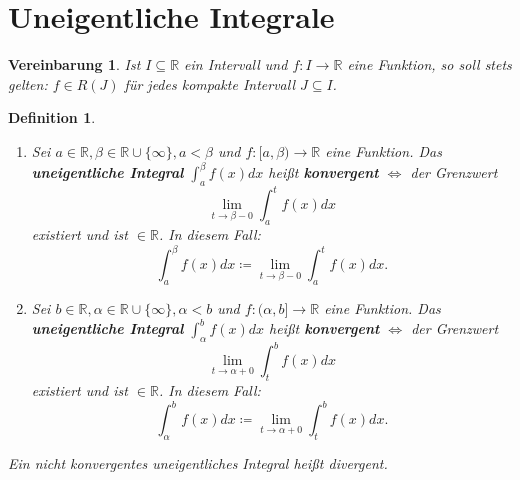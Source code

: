 \documentclass[titlepage,ngerman,a4paper,headsepline]{scrartcl}
\newcommand{\R}{\mathbb{R}}
\theoremstyle{named}
\theoremstyle{dotless}
\newtheorem*{definition}{Definition}
\newtheorem*{vereinbarung}{Vereinbarung}
\begin{document}
\newpage


\section{Uneigentliche Integrale}


\begin{vereinbarung}
	Ist $I \subseteq \R$ ein Intervall und $f \colon I \rightarrow \R$ eine Funktion, so soll stets gelten: $f \in R(J)$ für jedes kompakte Intervall $J \subseteq I$.	
\end{vereinbarung}

 
\begin{definition} ~\
	\begin{enumerate}
		\item Sei $a \in \R, \beta \in \R \cup \{ \infty \}, a < \beta$ und $f \colon [a, \beta) \rightarrow \R$ eine Funktion. Das \textbf{uneigentliche Integral} $\int_{a}^{\beta} f(x) dx$ hei{\ss}t \textbf{konvergent} $\iff$ der Grenzwert
			$$ \lim_{t \rightarrow \beta - 0} \int_{a}^{t} f(x) dx $$
			existiert und ist $\in \R$. In diesem Fall:
			$$ \int_{a}^{\beta} f(x) dx \coloneqq \lim_{t \rightarrow \beta - 0} \int_{a}^{t} f(x) dx. $$
		\item Sei $b \in \R, \alpha \in \R \cup \{ \infty \}, \alpha < b$ und $f \colon (\alpha, b] \rightarrow \R$ eine Funktion. Das \textbf{uneigentliche Integral} $\int_{\alpha}^{b} f(x) dx$ hei{\ss}t \textbf{konvergent} $\iff$ der Grenzwert
			$$ \lim_{t \rightarrow \alpha + 0} \int_{t}^{b} f(x) dx $$
			existiert und ist $\in \R$. In diesem Fall:
			$$ \int_{\alpha}^{b} f(x) dx \coloneqq \lim_{t \rightarrow \alpha + 0} \int_{t}^{b} f(x) dx. $$
	\end{enumerate}
	Ein nicht konvergentes uneigentliches Integral hei{\ss}t divergent.
\end{definition}
\end{document}

